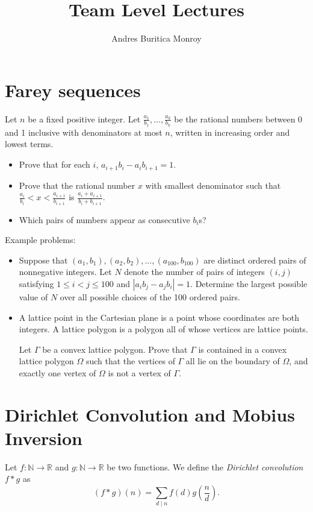 \documentclass{article}
\title{Team Level Lectures}
\author{Andres Buritica Monroy}
\date{}
\begin{document}
\maketitle
\section{Farey sequences}
Let $n$ be a fixed positive integer. Let
$\frac{a_1}{b_1},\ldots,\frac{a_k}{b_k}$ be the rational numbers between 0
and 1 inclusive with denominators at most $n$, written in increasing order
and lowest terms.
\begin{itemize}
	\item Prove that for each $i$, $a_{i+1}b_i-a_i b_{i+1}=1$.
	\item Prove that the rational number $x$ with smallest denominator such
	      that $\frac{a_i}{b_i}<x<\frac{a_{i+1}}{b_{i+1}}$ is
	      $\frac{a_i+a_{i+1}}{b_i+b_{i+1}}$.
	\item Which pairs of numbers appear as consecutive $b_i$s?
\end{itemize}

Example problems:
\begin{itemize}
	\item
	      Suppose that $(a_1,b_1),(a_2,b_2),\ldots,(a_{100},b_{100})$ are distinct
	      ordered pairs of nonnegative integers.
	      Let $N$ denote the number of pairs of integers $(i,j)$ satisfying
	      $1\leq i<j\leq 100$ and $|a_i b_j-a_j b_i|=1$.
	      Determine the largest possible value of $N$ over all possible choices of the
	      100 ordered pairs.
	\item A lattice point in the Cartesian plane is a point whose coordinates
	      are both integers. A lattice polygon is a polygon all of whose vertices
	      are lattice points.

	      Let $\Gamma$ be a convex lattice polygon. Prove that $\Gamma$ is contained
	      in a convex lattice polygon $\Omega$ such that the vertices of $\Gamma$
	      all lie on the boundary of $\Omega$, and exactly one vertex of $\Omega$ is
	      not a vertex of $\Gamma$.
\end{itemize}
\section{Dirichlet Convolution and Mobius Inversion}
Let $f:\mathbb N\to\mathbb R$ and $g:\mathbb N\to\mathbb R$ be two functions.
We define the \emph{Dirichlet convolution} $f*g$ as
\[(f*g)(n)=\sum_{d\mid n}f(d)g\left(\frac nd\right).\]
\end{document}
